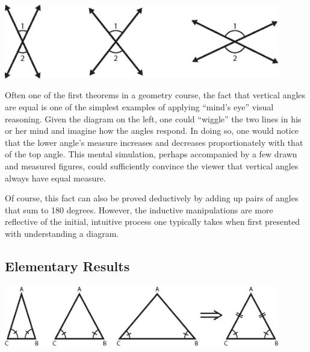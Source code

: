 \documentclass[10pt]{article}
\begin{document}
\singlespacing

\begin{center}
\includegraphics[width=0.9\textwidth]{diagrams/vertical.eps}
\end{center}


\onehalfspacing

Often one of the first theorems in a geometry course, the fact that
vertical angles are equal is one of the simplest examples of applying
``mind's eye'' visual reasoning.  Given the diagram on the left, one
could ``wiggle'' the two lines in his or her mind and imagine how the
angles respond.  In doing so, one would notice that the lower angle's
measure increases and decreases proportionately with that of the top
angle.  This mental simulation, perhaps accompanied by a few drawn and
measured figures, could sufficiently convince the viewer that vertical
angles always have equal measure.

Of course, this fact can also be proved deductively by adding up pairs
of angles that sum to 180 degrees.  However, the inductive
manipulations are more reflective of the initial, intuitive process
one typically takes when first presented with understanding a diagram.

\singlespacing

\subsection{Elementary Results}
\label{sec:elem}

\begin{center}
\includegraphics[width=0.9\textwidth]{diagrams/isoceles-triangle.eps}
\end{center}

\end{document}
